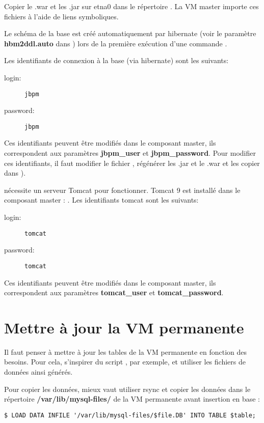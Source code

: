 Copier le .war et les .jar sur etna0 dans le répertoire .
La VM master importe ces fichiers à l'aide de liens symboliques.

Le schéma de la base  est créé automatiquement par hibernate (voir le paramètre \textbf{hbm2ddl.auto} dans ) lors de la première exécution d'une commande .

Les identifiants de connexion à la base  (via hibernate) sont les suivants:
\begin{description}
    \item[login:] \texttt{jbpm}
    \item[password:] \texttt{jbpm}
\end{description}
Ces identifiants peuvent être modifiés dans le composant master, ils correspondent aux paramètres \textbf{jbpm\_user} et \textbf{jbpm\_password}.
Pour modifier ces identifiants, il faut modifier le fichier , régénérer les .jar et le .war et les copier dans ).

 nécessite un serveur Tomcat pour fonctionner.
Tomcat 9 est installé dans le composant master : .
Les identifiants tomcat sont les suivants:
\begin{description}
    \item[login:] \texttt{tomcat}
    \item[password:] \texttt{tomcat}
\end{description}
Ces identifiants peuvent être modifiés dans le composant master, ils correspondent aux paramètres \textbf{tomcat\_user} et \textbf{tomcat\_password}.

\section{Mettre à jour la VM permanente}

Il faut penser à mettre à jour les tables de la VM permanente en fonction des besoins. Pour cela, s'inspirer du script , par exemple, et utiliser les fichiers de données ainsi générés.

Pour copier les données, mieux vaut utiliser rsync et copier les données dans le répertoire \textbf{/var/lib/mysql-files/} de la VM permanente avant insertion en base :
\begin{lstlisting}[style=bash]
$ LOAD DATA INFILE '/var/lib/mysql-files/$file.DB' INTO TABLE $table;
\end{lstlisting}
